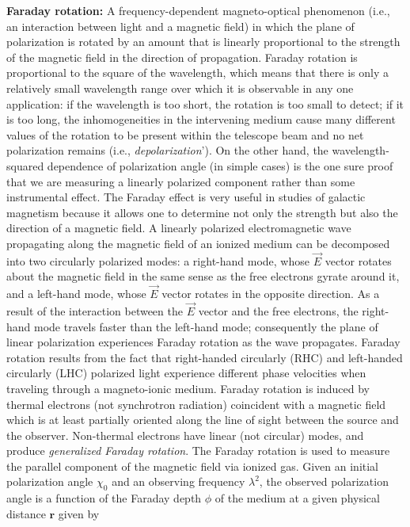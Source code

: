 \documentclass[a4paper,10pt]{article}
\begin{document}
{\noindent}\textbf{Faraday rotation:} A frequency-dependent magneto-optical phenomenon (i.e., an interaction between light and a magnetic field) in which the plane of polarization is rotated by an amount that is linearly proportional to the strength of the magnetic field in the direction of propagation. Faraday rotation is proportional to the square of the wavelength, which means that there is only a relatively small wavelength range over which it is observable in any one application: if the wavelength is too short, the rotation is too small to detect; if it is too long, the inhomogeneities in the intervening medium cause many different values of the rotation to be present within the telescope beam and no net polarization remains (i.e., \textit{depolarization}'). On the other hand, the wavelength-squared dependence of polarization angle (in simple cases) is the one sure proof that we are measuring a linearly polarized component rather than some instrumental effect. The Faraday effect is very useful in studies of galactic magnetism because it allows one to determine not only the strength but also the direction of a magnetic field. A linearly polarized electromagnetic wave propagating along the magnetic field of an ionized medium can be decomposed into two circularly polarized modes: a right-hand mode, whose $\vec{E}$ vector rotates about the magnetic field in the same sense as the free electrons gyrate around it, and a left-hand mode, whose $\vec{E}$ vector rotates in the opposite direction. As a result of the interaction between the $\vec{E}$ vector and the free electrons, the right-hand mode travels faster than the left-hand mode; consequently the plane of linear polarization experiences Faraday rotation as the wave propagates. Faraday rotation results from the fact that right-handed circularly (RHC) and left-handed circularly (LHC) polarized light experience different phase velocities when traveling through a magneto-ionic medium. Faraday rotation is induced by thermal electrons (not synchrotron radiation) coincident with a magnetic field which is at least partially oriented along the line of sight between the source and the observer. Non-thermal electrons have linear (not circular) modes, and produce \textit{generalized Faraday rotation}. The Faraday rotation is used to measure the parallel component of the magnetic field via ionized gas. Given an initial polarization angle $\chi_0$ and an observing frequency $\lambda^2$, the observed polarization angle is a function of the Faraday depth $\phi$ of the medium at a given physical distance $\mathbf{r}$ given by
\end{document}
